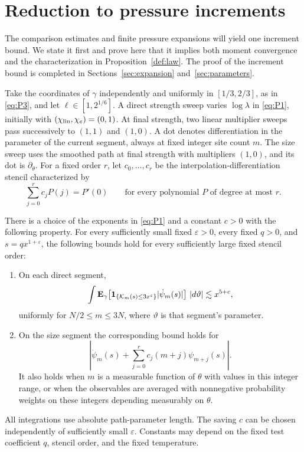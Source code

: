 \section{Reduction to pressure increments}\label{sec:reduction}

The comparison estimates and finite pressure expansions will yield one
increment bound. We state it first and prove here that it implies both
moment convergence and the characterization in Proposition~\ref{def:law}.
The proof of the increment bound is completed in
Sections~\ref{sec:expansion} and~\ref{sec:parameters}.

Take the coordinates of \(\gamma\) independently and uniformly in
\([1/3,2/3]\), as in \eqref{eq:P3}, and let
\(\ell\in[1,2^{1/6}]\). A direct strength sweep varies
\(\log\lambda\) in \eqref{eq:P1}, initially with
\((\chi_{\rm lin},\chi_e)=(0,1)\). At final strength, two linear
multiplier sweeps pass successively to \((1,1)\) and \((1,0)\).
A dot denotes differentiation in the parameter of the current segment,
always at fixed integer site count \(m\). The size sweep uses the
smoothed path at final strength with multipliers \((1,0)\), and its dot
is \(\partial_\theta\). For a fixed order \(r\), let \(c_0,\ldots,c_r\)
be the interpolation-differentiation stencil characterized by
\[
 \sum_{j=0}^r c_j P(j)=P'(0)
 \qquad\text{for every polynomial \(P\) of degree at most \(r\)}.
\]

\begin{proposition}\label{prop:increment}
There is a choice of the exponents in \eqref{eq:P1} and a constant
\(c>0\) with the following property. For every sufficiently small fixed
\(\varepsilon>0\), every fixed \(q>0\), and
\(s=q x^{1+\varepsilon}\), the following bounds hold for every
sufficiently large fixed stencil order:
\begin{enumerate}
\item On each direct segment,
\[
 \int \mathbf E_\gamma\!\left[
  {\bf1}_{\{\mathcal K_m(s)\le3x^\varepsilon\}}
       |\dot\psi_m(s)|\right]\,|d\vartheta|
 \lesssim x^{5+c},
\]
uniformly for \(N/2\le m\le3N\), where \(\vartheta\) is that
segment's parameter.
\item On the size segment the corresponding bound holds for
\begin{equation}
 \left|\dot\psi_m(s)+\sum_{j=0}^r
                   c_j(m+j)\psi_{m+j}(s)\right|.\tag{I}\label{eq:I}
\end{equation}
It also holds when \(m\) is a measurable function of \(\theta\) with
values in this integer range, or when the observables are averaged
with nonnegative probability weights on these integers depending
measurably on \(\theta\).
\end{enumerate}
All integrations use absolute path-parameter length. The saving \(c\)
can be chosen independently of sufficiently small \(\varepsilon\).
Constants may depend on the fixed test coefficient \(q\), stencil order,
and the fixed temperature.
\end{proposition}

